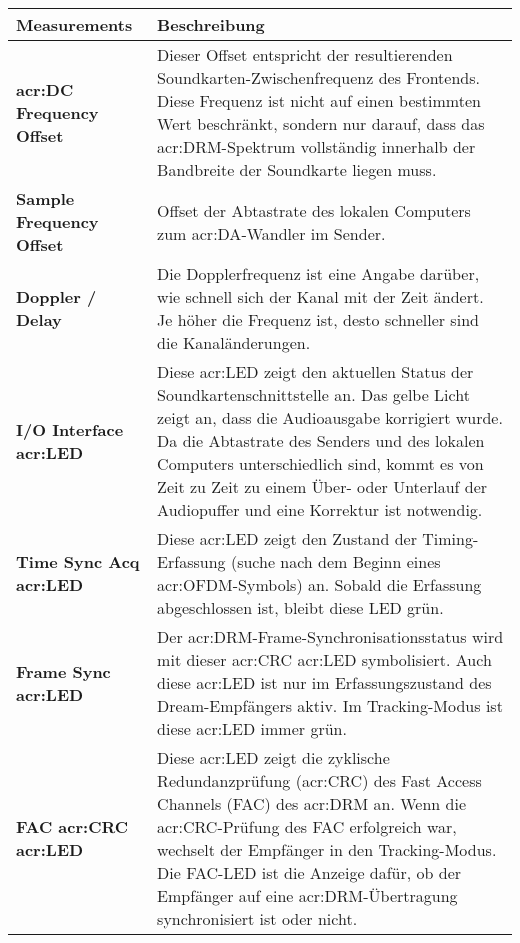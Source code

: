 \begin{table}[h]
	\begin{center}
		\begin{tabular}{p{0.28\linewidth}  p{0.72\linewidth}}	
			\toprule
			\textbf{Measurements} & \textbf{Beschreibung} \\
			\midrule
			\textbf{\gls{acr:DC} Frequency Offset} & Dieser Offset entspricht der resultierenden Soundkarten-Zwischenfrequenz des Frontends. Diese Frequenz ist nicht auf einen bestimmten Wert beschränkt, sondern nur darauf, dass das \gls{acr:DRM}-Spektrum vollständig innerhalb der Bandbreite der Soundkarte liegen muss.\\
			
			\textbf{Sample Frequency Offset} & Offset der Abtastrate des lokalen Computers zum \gls{acr:DA}-Wandler im Sender. \\
			
			\textbf{Doppler / Delay} & Die Dopplerfrequenz ist eine Angabe darüber, wie schnell sich der Kanal mit der Zeit ändert. Je höher die Frequenz ist, desto schneller sind die Kanaländerungen. \\
			
			\textbf{I/O Interface \gls{acr:LED}} & Diese \gls{acr:LED} zeigt den aktuellen Status der Soundkartenschnittstelle an. Das gelbe Licht zeigt an, dass die Audioausgabe korrigiert wurde. Da die Abtastrate des Senders und des lokalen Computers unterschiedlich sind, kommt es von Zeit zu Zeit zu einem Über- oder Unterlauf der Audiopuffer und eine Korrektur ist notwendig.\\
			
			\textbf{Time Sync Acq \gls{acr:LED}} &Diese \gls{acr:LED} zeigt den Zustand der Timing-Erfassung (suche nach dem Beginn eines \gls{acr:OFDM}-Symbols) an. Sobald die Erfassung abgeschlossen ist, bleibt diese LED grün.	\\
			
			\textbf{Frame Sync \gls{acr:LED}} & Der \gls{acr:DRM}-Frame-Synchronisationsstatus wird mit dieser \gls{acr:CRC} \gls{acr:LED} symbolisiert. Auch diese \gls{acr:LED} ist nur im Erfassungszustand des Dream-Empfängers aktiv. Im Tracking-Modus ist diese \gls{acr:LED} immer grün.\\
			
			\textbf{FAC \gls{acr:CRC} \gls{acr:LED}} & Diese \gls{acr:LED} zeigt die zyklische Redundanzprüfung (\gls{acr:CRC}) des Fast Access Channels (FAC) des \gls{acr:DRM} an. Wenn die \gls{acr:CRC}-Prüfung des FAC erfolgreich war, wechselt der Empfänger in den Tracking-Modus. Die FAC-LED ist die Anzeige dafür, ob der Empfänger auf eine \gls{acr:DRM}-Übertragung synchronisiert ist oder nicht. \\
			

\end{tabular}
\end{center}
\end{table}
